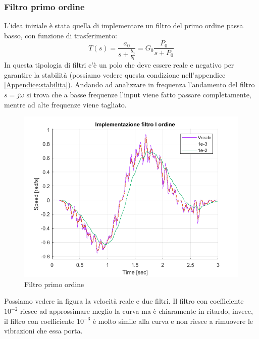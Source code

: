 \subsubsection*{Filtro primo ordine}
L'idea iniziale è stata quella di implementare un filtro del primo ordine passa basso, con funzione di trasferimento:
\begin{equation}
T(s) = \frac{a_0}{s+\frac{b_0}{b_1}} = G_0 \frac{P_0}{s+P_0}
\end{equation}
In questa tipologia di filtri c'è un polo che deve essere reale e negativo per garantire la stabilità (possiamo vedere questa condizione nell'appendice \ref{Appendice:stabilita}). Andando ad analizzare in frequenza l'andamento del filtro $s=j\omega$ si trova che a basse frequenze l'input viene fatto passare completamente, mentre ad alte frequenze viene tagliato.
\begin{figure}[ht]
	\begin{center}
		\includegraphics[scale=0.6]{Immagini/Traiettorie/FiltroIOrdine}
		\caption{Filtro primo ordine}
		\label{fig:filtroIOrd}
	\end{center}
\end{figure}
Possiamo vedere in figura la velocità reale e due filtri. Il filtro con coefficiente $10^{-2}$ riesce ad approssimare meglio la curva ma è chiaramente in ritardo, invece, il filtro con coefficiente $10^{-3}$ è molto simile alla curva e non riesce a rimuovere le vibrazioni che essa porta.
